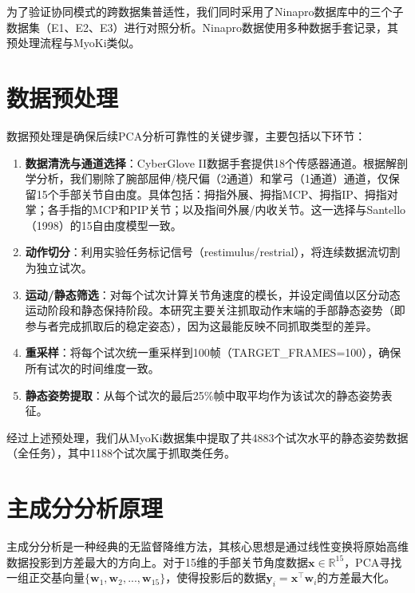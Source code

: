 \documentclass[12pt,a4paper]{report}
\begin{document}
为了验证协同模式的跨数据集普适性，我们同时采用了Ninapro数据库\cite{ninapro2014}中的三个子数据集（E1、E2、E3）进行对照分析。Ninapro数据使用多种数据手套记录，其预处理流程与MyoKi类似。

\section{数据预处理}

数据预处理是确保后续PCA分析可靠性的关键步骤，主要包括以下环节：

\begin{enumerate}[leftmargin=*,itemsep=2pt]
    \item \textbf{数据清洗与通道选择}：CyberGlove II数据手套提供18个传感器通道。根据解剖学分析，我们剔除了腕部屈伸/桡尺偏（2通道）和掌弓（1通道）通道，仅保留15个手部关节自由度。具体包括：拇指外展、拇指MCP、拇指IP、拇指对掌；各手指的MCP和PIP关节；以及指间外展/内收关节。这一选择与Santello（1998）的15自由度模型一致\cite{santello1998}。
    
    \item \textbf{动作切分}：利用实验任务标记信号（restimulus/restrial），将连续数据流切割为独立试次。
    
    \item \textbf{运动/静态筛选}：对每个试次计算关节角速度的模长，并设定阈值以区分动态运动阶段和静态保持阶段。本研究主要关注抓取动作末端的手部静态姿势（即参与者完成抓取后的稳定姿态），因为这最能反映不同抓取类型的差异。
    
    \item \textbf{重采样}：将每个试次统一重采样到100帧（TARGET\_FRAMES=100），确保所有试次的时间维度一致。
    
    \item \textbf{静态姿势提取}：从每个试次的最后25\%帧中取平均作为该试次的静态姿势表征。
\end{enumerate}

经过上述预处理，我们从MyoKi数据集中提取了共4883个试次水平的静态姿势数据（全任务），其中1188个试次属于抓取类任务。

\section{主成分分析原理}

主成分分析是一种经典的无监督降维方法，其核心思想是通过线性变换将原始高维数据投影到方差最大的方向上。对于15维的手部关节角度数据$\mathbf{x} \in \mathbb{R}^{15}$，PCA寻找一组正交基向量$\{\mathbf{w}_1, \mathbf{w}_2, ..., \mathbf{w}_{15}\}$，使得投影后的数据$\mathbf{y}_i = \mathbf{x}^\top \mathbf{w}_i$的方差最大化。
\end{document}
